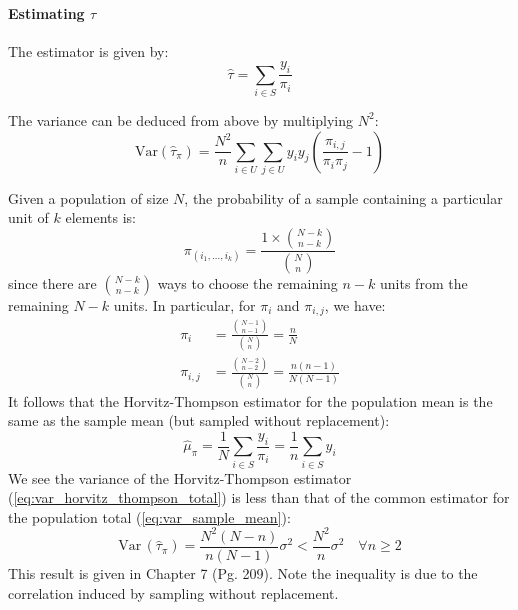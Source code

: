 \documentclass{article}
\begin{document}
\paragraph{Estimating $\tau$} The estimator is given by:
\begin{equation}\label{eq:horvitz_thompson_total}
    \hat{\tau} = \sum_{i\in S} \frac{y_i}{\pi_i}
\end{equation}

The variance can be deduced from above by multiplying $N^2$:
\begin{equation}\label{eq:var_horvitz_thompson_total}
    \mathrm{Var}(\hat{\tau}_{\pi}) = \frac{N^2}{n}\sum_{i\in U}\sum_{j\in U}y_{i}y_{j}\left(\frac{\pi_{i,j}}{\pi_{i}\pi_{j}}-1\right)
\end{equation}

\begin{example}\label{ex:srs}
   Given a population of size $N$, the probability of a sample containing a particular unit of $k$ elements is:
    \begin{equation*}
        \pi_{(i_1, \ldots, i_k)} = \frac{1 \times \binom{N-k}{n-k}}{\binom{N}{n}}
    \end{equation*}
    since there are $\binom{N-k}{n-k}$ ways to choose the remaining $n-k$ units from the remaining $N-k$ units.  
    In particular, for $\pi_i$ and $\pi_{i,j}$, we have:
    \begin{align*}
        \pi_i &= \frac{\binom{N-1}{n-1}}{\binom{N}{n}} = \frac{n}{N}\\
        \pi_{i,j} &= \frac{\binom{N-2}{n-2}}{\binom{N}{n}} = \frac{n(n-1)}{N(N-1)}
    \end{align*}
    It follows that the Horvitz-Thompson estimator for the population mean is the same as the sample mean (but sampled without replacement):
    \begin{equation*}
        \hat{\mu}_{\pi} = \frac{1}{N}\sum_{i\in S} \frac{y_i}{\pi_i} = \frac{1}{n}\sum_{i\in S} y_i
    \end{equation*}
    We see the variance of the Horvitz-Thompson estimator (\ref{eq:var_horvitz_thompson_total}) is less than that of the common estimator for the population total (\ref{eq:var_sample_mean}):
    \begin{equation*}
        \mathrm{Var}\,(\hat{\tau}_{\pi})=\frac{N^{2}(N-n)}{n(N-1)}\sigma^{2}<\frac{N^{2}}{n}\sigma^{2} \quad \forall n \geq 2
    \end{equation*}
    This result is given in \citep{alma990199486190107026} Chapter 7 (Pg. 209). Note the inequality is due to the correlation induced by sampling without replacement.
\end{example}
\end{document}
